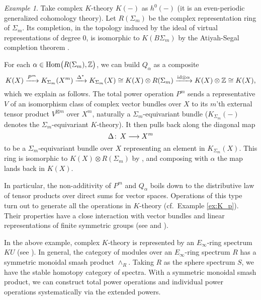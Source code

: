 \documentclass{gtpart}
\theoremstyle{definition}
\theoremstyle{remark}
\newtheorem{ex}[thm]{Example}
\def\co{\colon\thinspace}
\newcommand{\mb}[1]{\mathbb{#1}}
\newcommand{\Hom}{\ensuremath{{\rm Hom}}}
\newcommand{\BZ}{{\mb Z}}
\newcommand{\A}{\alpha}
\numberwithin{equation}{section}
\numberwithin{thm}{section}
\begin{document}
\begin{ex}
\label{ex:KU}
 Take complex $K$-theory $K(-)$ as $h^0(-)$ (it is an even-periodic 
 generalized cohomology theory).  Let $R(\Sigma_m)$ be the complex 
 representation ring of $\Sigma_m$.  Its completion, in the topology 
 induced by the ideal of virtual representations of degree 0, is 
 isomorphic to $K(B\Sigma_m)$ by the Atiyah-Segal completion theorem 
 \cite{atiyahsegal}.  

 For each $\A \in \Hom \big( R(\Sigma_m), \BZ \big)$, we can build 
 $Q_\A$ as a composite 
 \[
  K(X) \xrightarrow{P^m} K_{\Sigma_m}(X^m) \xrightarrow{\Delta^*} 
  K_{\Sigma_m}(X) \cong K(X) \otimes R(\Sigma_m) 
  \xrightarrow{{\rm id} \otimes \A} K(X) \otimes \BZ \cong K(X), 
 \]
 which we explain as follows.  The total power operation $P^m$ sends a 
 representative $V$ of an isomorphism class of complex vector bundles 
 over $X$ to its $m$'th external tensor product $V^{\boxtimes m}$ over 
 $X^m$, naturally a $\Sigma_m$-equivariant bundle ($K_{\Sigma_m}(-)$ 
 denotes the $\Sigma_m$-equivariant $K$-theory).  It then pulls back 
 along the diagonal map 
 \[
  \Delta \co X \longrightarrow X^m 
 \]
 to be a $\Sigma_m$-equivariant bundle over $X$ representing an element 
 in $K_{\Sigma_m}(X)$.  This ring is isomorphic to 
 $K(X) \otimes R(\Sigma_m)$ by \cite[Proposition 2.2]{segal}, and 
 composing with $\A$ the map lands back in $K(X)$.  

 In particular, the non-additivity of $P^m$ and $Q_\A$ boils down to the 
 distributive law of tensor products over direct sums for vector spaces.  
 Operations of this type turn out to generate all the operations in 
 $K$-theory (cf.~Example \ref{ex:K_p}).  Their properties have a close 
 interaction with vector bundles and linear representations of finite 
 symmetric groups (see \cite{adamsvector, atiyah} and 
 \cite[Sections 1-4]{lpo}).  
\end{ex}

In the above example, complex $K$-theory is represented by an 
$E_\infty$-ring spectrum $KU$ (see \cite[Theorem VIII.4.3]{EKMM}).  In 
general, the category of modules over an $E_\infty$-ring spectrum $R$ 
has a symmetric monoidal smash product $\wedge_R$.  Taking $R$ as the 
sphere spectrum $S$, we have the stable homotopy category of spectra.  
With a symmetric monoidal smash product, we can construct total power 
operations and individual power operations systematically via the 
extended powers.  
\end{document}

